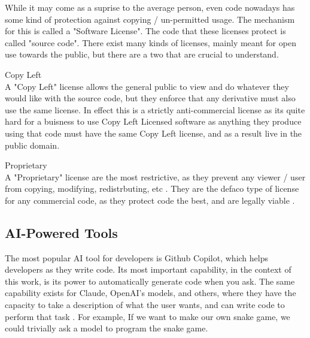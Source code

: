 \documentclass[journal]{IEEEtran}
\begin{document}
While it may come as a suprise to the average person,
even code nowadays has some kind of protection against
copying / un-permitted usage. The mechanism for this
is called a "Software License"\cite{Blackduck}.
The code that these licenses protect is called "source code".
There exist many kinds of licenses, mainly meant for
open use towards the public, but there are a two that are crucial to understand.

\begin{IEEEitemize}
\item Copy Left 
\\
  A "Copy Left" license allows the general public to view and do whatever they
  would like with the source code, but they enforce that any derivative must
  also use the same license. In effect this is a strictly anti-commercial license
  as its quite hard for a buisness to use Copy Left Licensed software as
  anything they produce using that code must have the same
  Copy Left license, and as a result live in the public domain.
  \cite{Blackduck}

\item Proprietary 
\\
A "Proprietary" license are the most restrictive, as they prevent any viewer / user from
copying, modifying, redistrbuting, etc \cite{Blackduck}. They are the defaco type of license for any
commercial code, as they protect code the best, and are legally viable \cite{harvard}. 
    
\end{IEEEitemize}



\subsection{AI-Powered Tools}

The most popular AI tool for developers is Github Copilot, which
helps developers as they write code. Its most important capability, in
the context of this work, is its power to automatically generate code when
you ask. The same capability exists for Claude, OpenAI's models, and others,
where they have the capacity to take a description of what the
user wants, and can write code to perform that task \cite{s_2023}. For example, If we
want to make our own snake game, we could trivially ask a model to
program the snake game.

\end{document}
